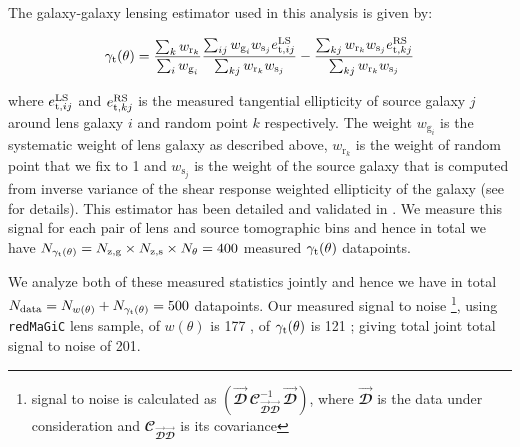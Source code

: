 \documentclass[aps, prd,twocolumn,superscriptaddress,nofootinbib,preprintnumbers]{revtex4-1}
\newcommand{\gammat}{\ensuremath{\gamma_{\rm t}(\theta)}}
\newcommand{\wtheta}{\ensuremath{w(\theta)}}
\newcommand{\redmagic}{\texttt{redMaGiC} }
\begin{document}
The galaxy-galaxy lensing estimator used in this analysis is given by:
\begin{linenomath*}
\begin{equation}
    \gamma_{\rm t}(\theta) = \frac{\sum_k w_{\textrm{r}_k}}{\sum_i w_{\textrm{g}_i}} \frac{\sum_{ij} w_{\textrm{g}_i} w_{\textrm{s}_j} e^{\rm LS}_{{\rm t},ij}}{\sum_{kj} w_{\textrm{r}_k} w_{\textrm{s}_j}} - \frac{\sum_{kj} w_{\textrm{r}_k} w_{\textrm{s}_j} e^{\rm RS}_{{\rm t},kj}}{\sum_{kj} w_{\textrm{r}_k} w_{\textrm{s}_j}}
\end{equation}
\end{linenomath*}
where $e^{\rm LS}_{{\rm t},ij}$ and $e^{\rm RS}_{{\rm t},kj}$ is the measured tangential ellipticity of source galaxy $j$ around lens galaxy $i$ and random point $k$ respectively. The weight $w_{\textrm{g}_i}$ is the systematic weight of lens galaxy as described above, $w_{\textrm{r}_k}$ is the weight of random point that we fix to 1 and $w_{\textrm{s}_j}$ is the weight of the source galaxy that is computed from inverse variance of the shear response weighted ellipticity of the galaxy (see \citealt{y3-shapecatalog} for details). 
This estimator has been detailed and validated in \cite{y3-gglensing}. We measure this signal for each pair of lens and source tomographic bins and hence in total we have  $N_{\gammat} = N_{\rm z,g} \times N_{\rm z,s} \times N_{\theta} = 400$ measured $\gammat$ datapoints. 

We analyze both of these measured statistics jointly and hence we have in total $N_{\rm data} = N_{\wtheta} + N_{\gammat} = 500$ datapoints. Our measured signal to noise \footnote{signal to noise is calculated as $(\vec{\mathbfcal{D}}\, {\mathbfcal{C}}^{-1}_{\vec{\mathbfcal{D}}\vec{\mathbfcal{D}}} \,  \vec{\mathbfcal{D}})$, where $\vec{\mathbfcal{D}}$ is the data under consideration and $\mathbfcal{C}_{\vec{\mathbfcal{D}}\vec{\mathbfcal{D}}}$ is its covariance}, using \redmagic lens sample, of $\wtheta$ is 177 \citep{y3-galaxyclustering}, of  $\gammat$ is 121 \citep{y3-gglensing}; giving total joint total signal to noise of 201. 
\end{document}
